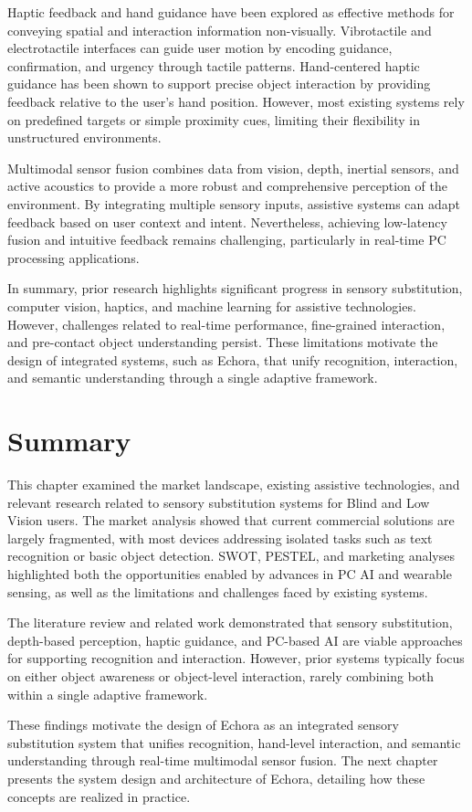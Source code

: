 Haptic feedback and hand guidance have been explored as effective methods for conveying spatial and interaction information non-visually. Vibrotactile and electrotactile interfaces can guide user motion by encoding guidance, confirmation, and urgency through tactile patterns. Hand-centered haptic guidance has been shown to support precise object interaction by providing feedback relative to the user’s hand position. However, most existing systems rely on predefined targets or simple proximity cues, limiting their flexibility in unstructured environments.

Multimodal sensor fusion combines data from vision, depth, inertial sensors, and active acoustics to provide a more robust and comprehensive perception of the environment. By integrating multiple sensory inputs, assistive systems can adapt feedback based on user context and intent. Nevertheless, achieving low-latency fusion and intuitive feedback remains challenging, particularly in real-time PC processing applications.

In summary, prior research highlights significant progress in sensory substitution, computer vision, haptics, and machine learning for assistive technologies. However, challenges related to real-time performance, fine-grained interaction, and pre-contact object understanding persist. These limitations motivate the design of integrated systems, such as Echora, that unify recognition, interaction, and semantic understanding through a single adaptive framework.


\section{Summary}

This chapter examined the market landscape, existing assistive technologies, and relevant research related to sensory substitution systems for Blind and Low Vision users. The market analysis showed that current commercial solutions are largely fragmented, with most devices addressing isolated tasks such as text recognition or basic object detection. SWOT, PESTEL, and marketing analyses highlighted both the opportunities enabled by advances in PC AI and wearable sensing, as well as the limitations and challenges faced by existing systems.

The literature review and related work demonstrated that sensory substitution, depth-based perception, haptic guidance, and PC-based AI are viable approaches for supporting recognition and interaction. However, prior systems typically focus on either object awareness or object-level interaction, rarely combining both within a single adaptive framework.

These findings motivate the design of Echora as an integrated sensory substitution system that unifies recognition, hand-level interaction, and semantic understanding through real-time multimodal sensor fusion. The next chapter presents the system design and architecture of Echora, detailing how these concepts are realized in practice.
